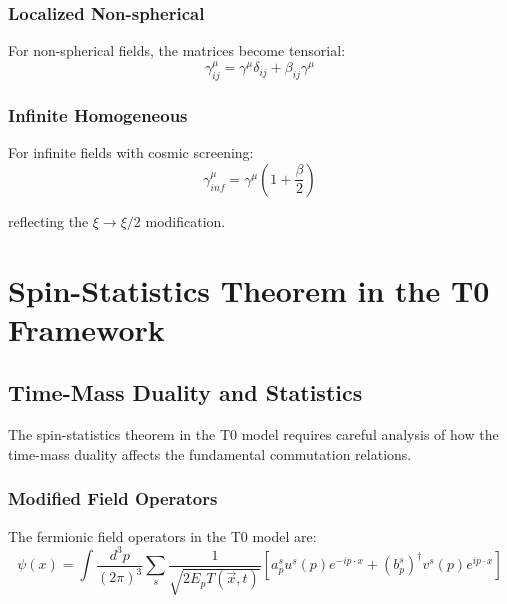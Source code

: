 \documentclass[12pt,a4paper]{article}
\newcommand{\Tfieldt}{T(\vec{x},t)}
\begin{document}
	\subsubsection{Localized Non-spherical}
	\label{subsubsec:nonsphere_matrices}
	
	For non-spherical fields, the matrices become tensorial:
	\begin{equation}
		\gamma^{\mu}_{ij} = \gamma^{\mu}\delta_{ij} + \beta_{ij}\gamma^{\mu}
		\label{eq:tensorial_gamma}
	\end{equation}
	
	\subsubsection{Infinite Homogeneous}
	\label{subsubsec:infinite_matrices}
	
	For infinite fields with cosmic screening:
	\begin{equation}
		\gamma^{\mu}_{inf} = \gamma^{\mu}(1 + \frac{\beta}{2})
		\label{eq:infinite_gamma}
	\end{equation}
	
	reflecting the $\xi \to \xi/2$ modification.
	
	\section{Spin-Statistics Theorem in the T0 Framework}
	\label{sec:spin_statistics_t0}
	
	\subsection{Time-Mass Duality and Statistics}
	\label{subsec:time_mass_statistics}
	
	The spin-statistics theorem in the T0 model requires careful analysis of how the time-mass duality affects the fundamental commutation relations.
	
	\subsubsection{Modified Field Operators}
	\label{subsubsec:modified_operators}
	
	The fermionic field operators in the T0 model are:
	\begin{equation}
		\psi(x) = \int\frac{d^3p}{(2\pi)^3} \sum_s \frac{1}{\sqrt{2E_p\Tfieldt}} \left[a_p^s u^s(p)e^{-ip\cdot x} + (b_p^s)^{\dagger}v^s(p)e^{ip\cdot x}\right]
		\label{eq:t0_field_operators}
	\end{equation}
	
\end{document}
